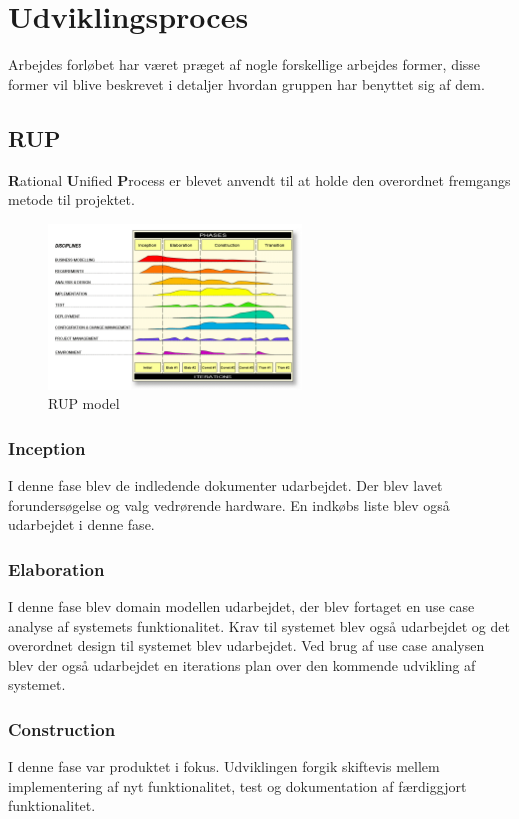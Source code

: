 \chapter{Udviklingsproces}
Arbejdes forløbet har været præget af nogle forskellige arbejdes former, disse former vil blive beskrevet i detaljer hvordan gruppen har benyttet sig af dem.

\section{RUP}
\textbf{R}ational \textbf{U}nified \textbf{P}rocess er blevet anvendt til at holde den overordnet fremgangs metode til projektet.  

\begin{figure}[H]
	\centering
	\includegraphics[width=0.60\textwidth]{Billeder/Udviklingsproces/RUP}
	\caption{RUP model}
	\label{fig:rup}
\end{figure}

\subsection{Inception}
I denne fase blev de indledende dokumenter udarbejdet. Der blev lavet forundersøgelse og valg vedrørende hardware. En indkøbs liste blev også udarbejdet i denne fase.  

\subsection{Elaboration}
I denne fase blev domain modellen udarbejdet, der blev fortaget en use case analyse af systemets funktionalitet. Krav til systemet blev også udarbejdet og det overordnet design til systemet blev udarbejdet. Ved brug af use case analysen blev der også udarbejdet en iterations plan over den kommende udvikling af systemet. 

\subsection{Construction}
I denne fase var produktet i fokus. Udviklingen forgik skiftevis mellem implementering af nyt funktionalitet, test og dokumentation af færdiggjort funktionalitet.

